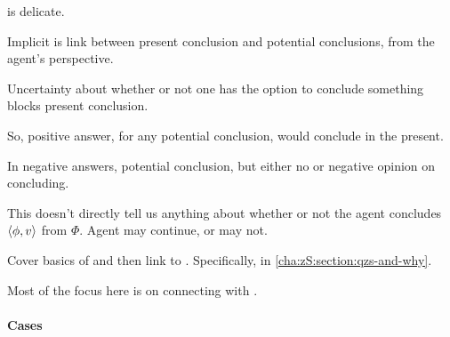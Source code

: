 \begin{note}
  \qzS{} is delicate.

  Implicit is link between present conclusion and potential conclusions, from the agent's perspective.

  Uncertainty about whether or not one has the option to conclude something blocks present conclusion.

  So, positive answer, for any potential conclusion, would conclude in the present.

  In negative answers, potential conclusion, but either no or negative opinion on concluding.

  This doesn't directly tell us anything about whether or not the agent concludes \(\langle \phi, v \rangle\) from \(\Phi\).
  Agent may continue, or may not.

  Cover basics of \qzS{} and then link to \qWhy{}.
  Specifically, in \autoref{cha:zS:section:qzs-and-why}.

  Most of the focus here is on connecting \qzS{} with \qWhy{}.
\end{note}

\paragraph{Cases}

